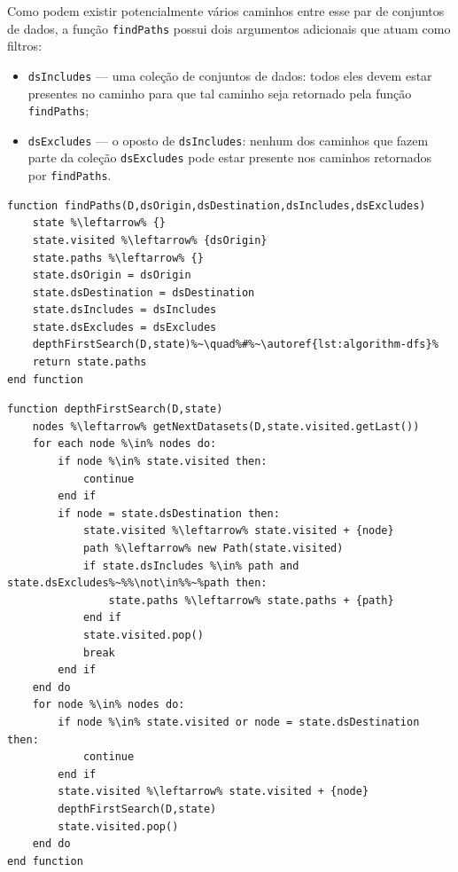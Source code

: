 Como podem existir potencialmente vários caminhos entre esse par de conjuntos de dados, a função \texttt{findPaths} possui dois argumentos adicionais que atuam como filtros:

\begin{itemize}
    \item \texttt{dsIncludes} --- uma coleção de conjuntos de dados: todos eles devem estar presentes no caminho para que tal caminho seja retornado pela função \texttt{findPaths};
    \item \texttt{dsExcludes} --- o oposto de \texttt{dsIncludes}: nenhum dos caminhos que fazem parte da coleção \texttt{dsExcludes} pode estar presente nos caminhos retornados por \texttt{findPaths}.
\end{itemize}

\begin{minipage}[c]{0.95\textwidth}
\begin{lstlisting}[language=pseudocode,label={lst:algorithm-find-paths},caption={[Obtenção dos caminhos entre dois conjuntos de dados.]Obtenção de todos os caminhos entre dois conjuntos de dados, inicializando a \textsc{DFS} com um estado inicial apropriado.}]
function findPaths(D,dsOrigin,dsDestination,dsIncludes,dsExcludes)
    state %\leftarrow% {}
    state.visited %\leftarrow% {dsOrigin}
    state.paths %\leftarrow% {}
    state.dsOrigin = dsOrigin
    state.dsDestination = dsDestination
    state.dsIncludes = dsIncludes
    state.dsExcludes = dsExcludes
    depthFirstSearch(D,state)%~\quad%#%~\autoref{lst:algorithm-dfs}%
    return state.paths
end function
\end{lstlisting}
\end{minipage}

\begin{minipage}[c]{0.95\textwidth}
\begin{lstlisting}[language=pseudocode,label={lst:algorithm-dfs},caption={[Busca em Profundidade (DFS) dos caminhos]Depth First Search (DFS): busca em profundidade de todos os caminhos entre dois conjuntos de dados.}]
function depthFirstSearch(D,state)
    nodes %\leftarrow% getNextDatasets(D,state.visited.getLast())
    for each node %\in% nodes do:
        if node %\in% state.visited then:
            continue
        end if
        if node = state.dsDestination then:
            state.visited %\leftarrow% state.visited + {node}
            path %\leftarrow% new Path(state.visited)
            if state.dsIncludes %\in% path and state.dsExcludes%~%%\not\in%%~%path then:
                state.paths %\leftarrow% state.paths + {path}
            end if
            state.visited.pop()
            break
        end if
    end do
    for node %\in% nodes do:
        if node %\in% state.visited or node = state.dsDestination then:
            continue
        end if
        state.visited %\leftarrow% state.visited + {node}
        depthFirstSearch(D,state)
        state.visited.pop()
    end do
end function
\end{lstlisting}
\end{minipage}


